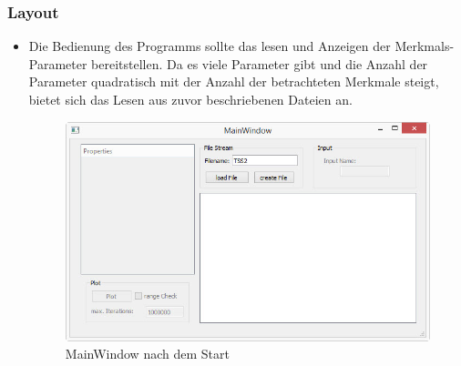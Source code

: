 \documentclass{article}
\begin{document}
		\subsubsection{Layout}
		\begin{itemize}
			\item Die Bedienung des Programms sollte das lesen und Anzeigen der Merkmals-Parameter bereitstellen. Da es viele Parameter gibt und die Anzahl der Parameter quadratisch mit der Anzahl der betrachteten Merkmale steigt, bietet sich das Lesen aus zuvor beschriebenen Dateien an.
			\begin{figure}[H]
				\centering
				\includegraphics[width=0.7\linewidth]{./MainWindow_Start}
				\caption[Startwindow]{MainWindow nach dem Start}
				\label{MainWindow_Start}
			\end{figure}


\end{itemize}
\end{document}
